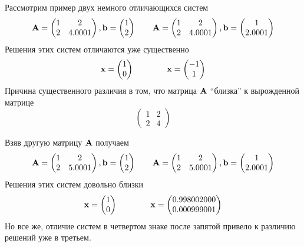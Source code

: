\documentclass[professionalfonts,compress,unicode]{beamer}
\begin{document}
{
Рассмотрим пример двух немного отличающихся систем
$$
{\bf A} = \begin{pmatrix}
	1&2\\
	2&4.0001\\
\end{pmatrix}
,{\bf b} = \begin{pmatrix}
	1\\2\\
\end{pmatrix}
\qquad
{\bf A} = \begin{pmatrix}
	1&2\\
	2&4.0001\\
\end{pmatrix}
,{\bf b} = \begin{pmatrix}
	1\\2.0001\\
\end{pmatrix}
$$
Решения этих систем отличаются уже существенно
$$
{\bf x} = \begin{pmatrix}
	1\\0
\end{pmatrix}
\qquad\qquad
{\bf x} = \begin{pmatrix}
	-1\\1
\end{pmatrix}
$$
Причина существенного различия в том, что матрица ${\bf A}$ ``близка'' к вырожденной матрице 
$$
\begin{pmatrix}
	1&2\\
	2&4
\end{pmatrix}
$$
}

{
Взяв другую матрицу ${\bf A}$ получаем
$$
{\bf A} = \begin{pmatrix}
	1&2\\
	2&5.0001\\
\end{pmatrix}
,{\bf b} = \begin{pmatrix}
	1\\2\\
\end{pmatrix}
\qquad
{\bf A} = \begin{pmatrix}
	1&2\\
	2&5.0001\\
\end{pmatrix}
,{\bf b} = \begin{pmatrix}
	1\\2.0001\\
\end{pmatrix}
$$
Решения этих систем довольно близки
$$
{\bf x} = \begin{pmatrix}
	1\\0
\end{pmatrix}
\qquad\qquad
{\bf x} = \begin{pmatrix}
	0.998002000\\0.000999001
\end{pmatrix}
$$
Но все же, отличие систем в четвертом знаке после запятой привело к различию
решений уже в третьем.
$$
\phantom{
\begin{pmatrix}
	1&2\\
	2&4
\end{pmatrix}
}
$$
}
\end{document}
